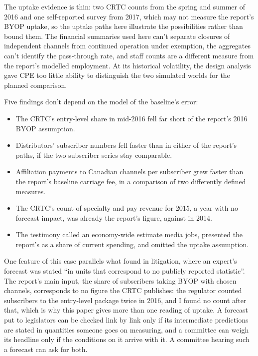 The uptake evidence is thin: two CRTC counts from the spring and summer of 2016 and one self-reported survey from 2017, which may not measure the report's BYOP uptake, so the uptake paths here illustrate the possibilities rather than bound them. The financial summaries used here can't separate closures of independent channels from continued operation under exemption, the aggregates can't identify the pass-through rate, and staff counts are a different measure from the report's modelled employment. At its historical volatility, the design analysis gave CPE too little ability to distinguish the two simulated worlds for the planned comparison.

Five findings don't depend on the model of the baseline's error:
\begin{itemize}
\item The CRTC's entry-level share in mid-2016 fell far short of the report's 2016 BYOP assumption.
\item Distributors' subscriber numbers fell faster than in either of the report's paths, if the two subscriber series stay comparable.
\item Affiliation payments to Canadian channels per subscriber grew faster than the report's baseline carriage fee, in a comparison of two differently defined measures.
\item The CRTC's count of specialty and pay revenue for 2015, a year with no forecast impact, was already \lttvGapFifteenSpec{} \lttvGapFifteenSpecDir{} the report's figure, against \lttvGapFourteenSpec{} in 2014.
\item The testimony called an economy-wide estimate media jobs, presented the report's \lttvCPEShareStated{} as a share of current spending, and omitted the uptake assumption.
\end{itemize}

One feature of this case parallels what \textcite[486]{kane2026sffa} found in litigation, where an expert's forecast was stated \enquote{in units that correspond to no publicly reported statistic}. The report's main input, the share of subscribers taking BYOP with chosen channels, corresponds to no figure the CRTC publishes: the regulator counted subscribers to the entry-level package twice in 2016, and I found no count after that, which is why this paper gives more than one reading of uptake. A forecast put to legislators can be checked link by link only if its intermediate predictions are stated in quantities someone goes on measuring, and a committee can weigh its headline only if the conditions on it arrive with it. A committee hearing such a forecast can ask for both.

